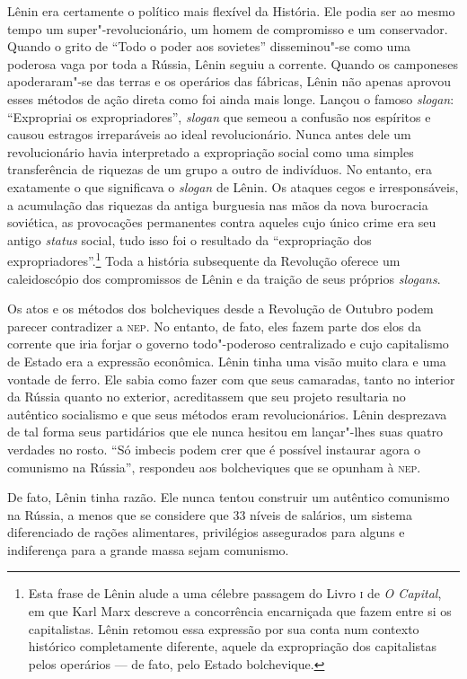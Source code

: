 Lênin era certamente o político mais flexível da História. Ele podia
ser ao mesmo tempo um super"-revolucionário, um homem de compromisso e
um conservador. Quando o grito de “Todo o poder aos sovietes” 
disseminou"-se como uma poderosa vaga por toda a Rússia, Lênin seguiu a
corrente. Quando os camponeses apoderaram"-se das terras e os
operários das fábricas, Lênin não apenas aprovou esses métodos de ação
direta como foi ainda mais longe. Lançou o famoso \textit{slogan}: “Expropriai
os expropriadores”, \textit{slogan} que semeou a confusão nos espíritos e causou
estragos irreparáveis ao ideal revolucionário. Nunca antes dele um
revolucionário havia interpretado a expropriação social como uma
simples transferência de riquezas de um grupo a outro de indivíduos.
No entanto, era exatamente o que significava o \textit{slogan} de Lênin. Os
ataques cegos e irresponsáveis, a acumulação das riquezas da antiga
burguesia nas mãos da nova burocracia soviética, as provocações
permanentes contra aqueles cujo único crime era seu antigo \textit{status}
social, tudo isso foi o resultado da “expropriação dos
expropriadores”.\footnote{
Esta frase de Lênin alude a uma célebre passagem do Livro \textsc{i} de 
\textit{O Capital}, em que Karl Marx descreve a concorrência encarniçada que
fazem entre si os capitalistas. Lênin retomou essa expressão por sua
conta num contexto histórico completamente diferente, aquele da
expropriação dos capitalistas pelos operários --- de fato, pelo Estado
bolchevique.} 
Toda a história subsequente da Revolução oferece um
caleidoscópio dos compromissos de Lênin e da traição de seus próprios
\textit{slogans}.

Os atos e os métodos dos bolcheviques desde a Revolução de Outubro podem
parecer contradizer a \textsc{nep}. No entanto, de fato, eles fazem parte dos
elos da corrente que iria forjar o governo todo"-poderoso centralizado
e cujo capitalismo de Estado era a expressão econômica. Lênin tinha uma
visão muito clara e uma vontade de ferro. Ele sabia como fazer com que
seus camaradas, tanto no interior da Rússia quanto no exterior, acreditassem
que seu projeto resultaria no autêntico socialismo e que seus métodos
eram revolucionários. Lênin desprezava de tal forma seus partidários
que ele nunca hesitou em lançar"-lhes suas quatro verdades no rosto.
“Só imbecis podem crer que é possível instaurar agora o comunismo na
Rússia”, respondeu aos bolcheviques que se opunham à \textsc{nep}.

De fato, Lênin tinha razão. Ele nunca tentou construir um autêntico
comunismo na Rússia, a menos que se considere que 33 níveis
de salários, um sistema diferenciado de rações alimentares, privilégios
assegurados para alguns e indiferença para a grande massa sejam
comunismo.

